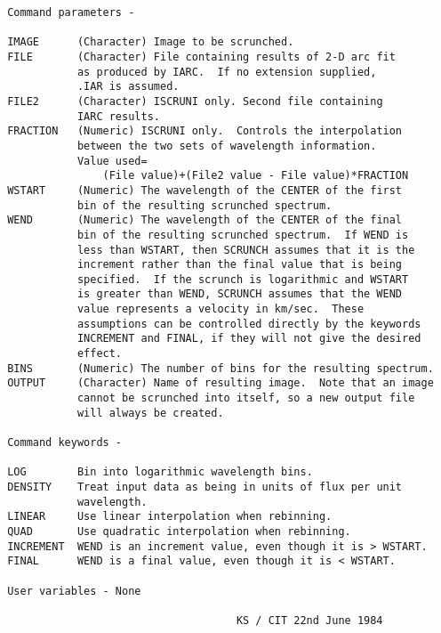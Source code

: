 \begin{description}
\begin{verbatim}
 Command parameters -

 IMAGE      (Character) Image to be scrunched.
 FILE       (Character) File containing results of 2-D arc fit
            as produced by IARC.  If no extension supplied,
            .IAR is assumed.
 FILE2      (Character) ISCRUNI only. Second file containing
            IARC results.
 FRACTION   (Numeric) ISCRUNI only.  Controls the interpolation
            between the two sets of wavelength information.
            Value used=
                (File value)+(File2 value - File value)*FRACTION
 WSTART     (Numeric) The wavelength of the CENTER of the first
            bin of the resulting scrunched spectrum.
 WEND       (Numeric) The wavelength of the CENTER of the final
            bin of the resulting scrunched spectrum.  If WEND is
            less than WSTART, then SCRUNCH assumes that it is the
            increment rather than the final value that is being
            specified.  If the scrunch is logarithmic and WSTART
            is greater than WEND, SCRUNCH assumes that the WEND
            value represents a velocity in km/sec.  These
            assumptions can be controlled directly by the keywords
            INCREMENT and FINAL, if they will not give the desired
            effect.
 BINS       (Numeric) The number of bins for the resulting spectrum.
 OUTPUT     (Character) Name of resulting image.  Note that an image
            cannot be scrunched into itself, so a new output file
            will always be created.

 Command keywords -

 LOG        Bin into logarithmic wavelength bins.
 DENSITY    Treat input data as being in units of flux per unit
            wavelength.
 LINEAR     Use linear interpolation when rebinning.
 QUAD       Use quadratic interpolation when rebinning.
 INCREMENT  WEND is an increment value, even though it is > WSTART.
 FINAL      WEND is a final value, even though it is < WSTART.

 User variables - None

                                     KS / CIT 22nd June 1984
\end{verbatim}
\end{description}
